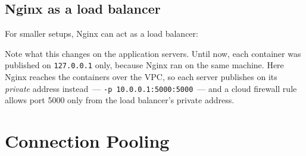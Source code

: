 \subsection*{Nginx as a load balancer}\label{36-scaling-load:nginx-as-a-load-balancer}

For smaller setups, Nginx can act as a load balancer:

\begin{codebox}

\begin{Shaded}
\begin{Highlighting}[]

\NormalTok{\}}

\NormalTok{    \}}
\NormalTok{\}}
\end{Highlighting}
\end{Shaded}

\end{codebox}

\noindent{}Note what this changes on the application servers. Until now, each container was published on \texttt{127.0.0.1} only, because Nginx ran on the same machine. Here Nginx reaches the containers over the VPC, so each server publishes on its \emph{private} address instead~--- \texttt{-p\ 10.0.0.1:5000:5000}~--- and a cloud firewall rule allows port 5000 only from the load balancer's private address.

\setcounter{section}{4}
\section{Connection Pooling}\label{36-scaling-load:365-connection-pooling}

